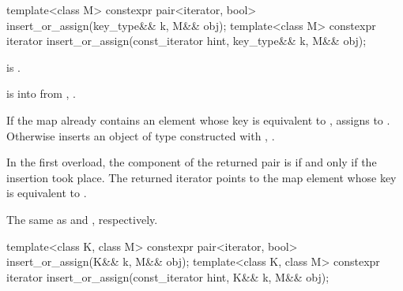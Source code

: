 %
\begin{itemdecl}
template<class M>
  constexpr pair<iterator, bool> insert_or_assign(key_type&& k, M&& obj);
template<class M>
  constexpr iterator insert_or_assign(const_iterator hint, key_type&& k, M&& obj);
\end{itemdecl}

\begin{itemdescr}
\pnum
\mandates
{} is .

\pnum
\expects
{} is  into 
from , .

\pnum
\effects
If the map already contains an element 
whose key is equivalent to ,
assigns  to .
Otherwise inserts an object of type 
constructed with , .

\pnum
\returns
In the first overload,
the  component of the returned pair is 
if and only if the insertion took place.
The returned iterator points to the map element
whose key is equivalent to .

\pnum
\complexity
The same as  and ,
respectively.
\end{itemdescr}

%
\begin{itemdecl}
template<class K, class M>
  constexpr pair<iterator, bool> insert_or_assign(K&& k, M&& obj);
template<class K, class M>
  constexpr iterator insert_or_assign(const_iterator hint, K&& k, M&& obj);
\end{itemdecl}

